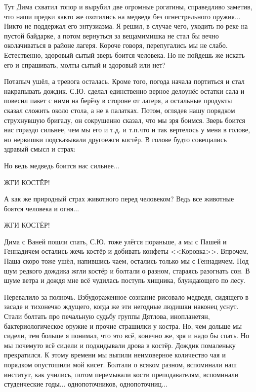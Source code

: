 Тут Дима схватил топор и вырубил две огромные рогатины, справедливо заметив, что наши предки как\sdash то же охотились на медведя без огнестрельного оружия$\ldots$ Никто не поддержал его энтузиазма. Я решил, в случае чего, уходить по реке на пустой байдарке, а потом вернуться за вещами\mdash мишка не стал бы вечно околачиваться в районе лагеря. Короче говоря, перепугались мы не слабо. Естественно, здоровый сытый зверь боится человека. Но не пойдешь же искать его и спрашивать, мол\mdash ты сытый и здоровый или нет? 

Потапыч ушёл, а тревога осталась. Кроме того, погода начала портиться и стал накрапывать дождик. С.Ю. сделал единственно верное дело\mdash унёс остатки сала и повесил пакет с ними на берёзу в стороне от лагеря, а остальные продукты сказал сложить около стола, а не в палатках. Потом, оглядев нашу порядком струхнувшую бригаду, он сокрушенно сказал, что мы зря боимся. Зверь боится нас гораздо сильнее, чем мы его и т.д. и т.п.\mdash что и так вертелось у меня в голове, но нервишки подсказывали другое\mdash жги костёр. В голове будто совещались здравый смысл и страх:

\diagdash Но ведь медведь боится нас сильнее$\ldots$  

\diagdash ЖГИ КОСТЁР! 

\diagdash А как же природный страх животного перед человеком? Ведь все животные боятся человека и огня$\ldots$  

\diagdash Ж\sdash Г\sdash И \enspace К\sdash О\sdash С\sdash Т\sdash Ё\sdash Р!

Дима с Ваней пошли спать, С.Ю. тоже улёгся пораньше, а мы с Пашей и Геннадичем остались жечь костёр и добивать конфеты <<Коровка>>. Впрочем, Паша скоро тоже ушёл, напившись чаем, остались только мы с Геннадичем. Под шум редкого дождика жгли костёр и болтали о разном, стараясь разогнать сон. В шуме ветра и дождя мне всё чудилась поступь хищника, блуждающего по лесу. 

Перевалило за полночь. Взбудораженное сознание рисовало медведя, сидящего в засаде и тихонечко ждущего, когда же эти негодные людишки наконец уснут. Стали болтать про печальную судьбу группы Дятлова, инопланетян, бактериологическое оружие и прочие страшилки у костра. Но, чем дольше мы сидели, тем больше я понимал, что это всё, конечно же, зря и надо бы спать. Но мы почему\sdash то всё сидели и подкидывали дрова в костёр. Дождик помаленьку прекратился. К этому времени мы выпили неимоверное количество чая и порядком опустошили мой кисет. Болтали о всяком разном, вспоминали наш институт, как учились, потом перемывали кости преподавателям, вспоминали студенческие годы$\ldots$ однопоточников, однопоточниц$\ldots$ %

